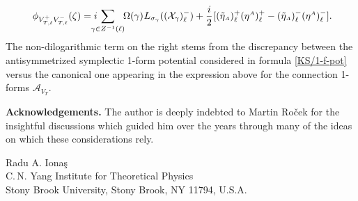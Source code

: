 \documentclass[11pt]{amsart}
\theoremstyle{remark}
\theoremstyle{remark}
\theoremstyle{definition}
\theoremstyle{definition}
\theoremstyle{definition}
\newcommand{\0}{{\scriptstyle 0'}} %
\newcommand{\1}{{\scriptstyle 1'}}
\newcommand{\A}{{\scriptscriptstyle A}} %
\newcommand{\hp}{\hspace{0.5pt}} %
\newcommand{\Address}{{%
  \bigskip\bigskip 
  \sffamily
            Radu A. Iona\c{s} \\[3pt]
\indent C.\,N. Yang Institute for Theoretical Physics \\
\indent Stony Brook University, Stony Brook, NY 11794, U.S.A.

}}
\begin{document}
\begin{equation}
\phi_{V_{T,\ell}^+ V_{T,\ell}^-} (\zeta) =  i \!\!\!\!\! \sum_{\gamma \in Z^{-1}(\ell) } \!\! \Omega(\gamma)\hp L_{\sigma_{\gamma}}((\mathcal{X}_{\gamma})^-_{\ell}) + \frac{i}{2} \hp [  (\tilde{\eta}_{\A})^+_{\ell} (\eta^{\A})^+_{\ell} - (\tilde{\eta}_{\A})^-_{\ell} (\eta^{\A})^-_{\ell}] \rlap{.}
\end{equation}
The non-dilogarithmic term on the right stems from the discrepancy between the antisymmetrized symplectic 1-form potential considered in formula \eqref{KS/1-f-pot} versus the canonical one appearing in the expression above for the connection 1-forms $\mathcal{A}_{V_T}$.  

\bigskip\bigskip

\noindent \textbf{Acknowledgements.}
The author is deeply indebted to Martin Ro\v{c}ek for the insightful discussions which guided him over the years through many of the ideas on which these considerations rely.












\Address
\end{document}
